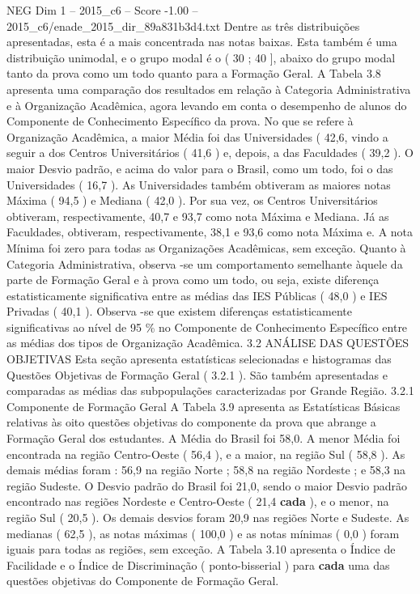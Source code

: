 \begin{textsample}{NEG Dim 1 – 2015\_c6 – Score -1.00 – 2015\_c6/enade\_2015\_dir\_89a831b3d4.txt}
Dentre as três distribuições apresentadas, esta é a mais concentrada nas notas baixas.
Esta também é uma distribuição unimodal, e o grupo modal é o ( 30 ; 40 ], abaixo do grupo modal tanto da prova como um todo quanto para a Formação Geral.
A Tabela 3.8 apresenta uma comparação dos resultados em relação à Categoria Administrativa e à Organização Acadêmica, agora levando em conta o desempenho de alunos do Componente de Conhecimento Específico da prova.
No que se refere à Organização Acadêmica, a maior Média foi das Universidades ( 42,6, vindo a seguir a dos Centros Universitários ( 41,6 ) e, depois, a das Faculdades ( 39,2 ).
O maior Desvio padrão, e acima do valor para o Brasil, como um todo, foi o das Universidades ( 16,7 ).
As Universidades também obtiveram as maiores notas Máxima ( 94,5 ) e Mediana ( 42,0 ).
Por sua vez, os Centros Universitários obtiveram, respectivamente, 40,7 e 93,7 como nota Máxima e Mediana.
Já as Faculdades, obtiveram, respectivamente, 38,1 e 93,6 como nota Máxima e.
A nota Mínima foi zero para todas as Organizações Acadêmicas, sem exceção.
Quanto à Categoria Administrativa, observa -se um comportamento semelhante àquele da parte de Formação Geral e à prova como um todo, ou seja, existe diferença estatisticamente significativa entre as médias das IES Públicas ( 48,0 ) e IES Privadas ( 40,1 ).
Observa -se que existem diferenças estatisticamente significativas ao nível de 95 \% no Componente de Conhecimento Específico entre as médias dos tipos de Organização Acadêmica. 3.2 ANÁLISE DAS QUESTÕES OBJETIVAS Esta seção apresenta estatísticas selecionadas e histogramas das Questões Objetivas de Formação Geral ( 3.2.1 ).
São também apresentadas e comparadas as médias das subpopulações caracterizadas por Grande Região. 3.2.1 Componente de Formação Geral A Tabela 3.9 apresenta as Estatísticas Básicas relativas às oito questões objetivas do componente da prova que abrange a Formação Geral dos estudantes.
A Média do Brasil foi 58,0.
A menor Média foi encontrada na região Centro-Oeste ( 56,4 ), e a maior, na região Sul ( 58,8 ).
As demais médias foram : 56,9 na região Norte ; 58,8 na região Nordeste ; e 58,3 na região Sudeste.
O Desvio padrão do Brasil foi 21,0, sendo o maior Desvio padrão encontrado nas regiões Nordeste e Centro-Oeste ( 21,4 \textbf{cada} ), e o menor, na região Sul ( 20,5 ).
Os demais desvios foram 20,9 nas regiões Norte e Sudeste.
As medianas ( 62,5 ), as notas máximas ( 100,0 ) e as notas mínimas ( 0,0 ) foram iguais para todas as regiões, sem exceção.
A Tabela 3.10 apresenta o Índice de Facilidade e o Índice de Discriminação ( ponto-bisserial ) para \textbf{cada} uma das questões objetivas do Componente de Formação Geral.

\end{textsample}

